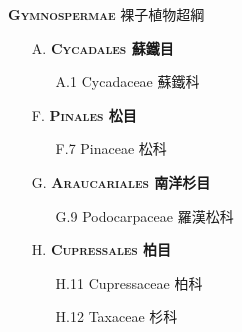 \noindent \normalsize\textsc{\textbf{Gymnospermae} 裸子植物超綱}\selectfont \\
\footnotesize\selectfont
\begin{enumerate}
  \item[A. ] \textbf{\textsc{Cycadales} 蘇鐵目} 
    \begin{enumerate}
      \item[A.1] Cycadaceae 蘇鐵科   
        
\end{enumerate}
  \item[F. ] \textbf{\textsc{Pinales} 松目} 
    \begin{enumerate}
      \item[F.7] Pinaceae 松科   
        
\end{enumerate}
  \item[G. ] \textbf{\textsc{Araucariales} 南洋杉目} 
    \begin{enumerate}
      \item[G.9] Podocarpaceae 羅漢松科   
        
\end{enumerate}
  \item[H. ] \textbf{\textsc{Cupressales} 柏目} 
    \begin{enumerate}
      \item[H.11] Cupressaceae 柏科   
        
      \item[H.12] Taxaceae 杉科   
        
\end{enumerate}
\end{enumerate}
\vspace{2ex} 

